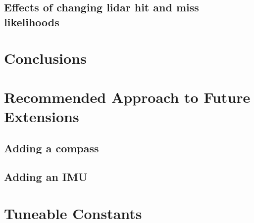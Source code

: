 \documentclass[10pt]{IEEEtran}
\begin{document}
\subsection{Effects of changing lidar hit and miss likelihoods}


\section{Conclusions}

\section{Recommended Approach to Future Extensions}
\subsection{Adding a compass}
\subsection{Adding an IMU}

\appendix
\section{Tuneable Constants}



\end{document}
